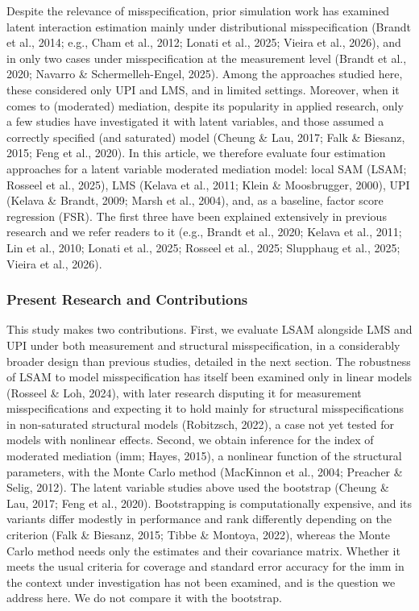 \documentclass[
  man,
  longtable,
  nolmodern,
  notxfonts,
  notimes,
  colorlinks=true,linkcolor=blue,citecolor=blue,urlcolor=blue]{apa7}
\begin{document}
Despite the relevance of misspecification, prior simulation work has
examined latent interaction estimation mainly under distributional
misspecification (Brandt et al., 2014; e.g., Cham et al., 2012; Lonati
et al., 2025; Vieira et al., 2026), and in only two cases under
misspecification at the measurement level (Brandt et al., 2020; Navarro
\& Schermelleh-Engel, 2025). Among the approaches studied here, these
considered only UPI and LMS, and in limited settings. Moreover, when it
comes to (moderated) mediation, despite its popularity in applied
research, only a few studies have investigated it with latent variables,
and those assumed a correctly specified (and saturated) model (Cheung \&
Lau, 2017; Falk \& Biesanz, 2015; Feng et al., 2020). In this article,
we therefore evaluate four estimation approaches for a latent variable
moderated mediation model: local SAM (LSAM; Rosseel et al., 2025), LMS
(Kelava et al., 2011; Klein \& Moosbrugger, 2000), UPI (Kelava \&
Brandt, 2009; Marsh et al., 2004), and, as a baseline, factor score
regression (FSR). The first three have been explained extensively in
previous research and we refer readers to it (e.g., Brandt et al., 2020;
Kelava et al., 2011; Lin et al., 2010; Lonati et al., 2025; Rosseel et
al., 2025; Slupphaug et al., 2025; Vieira et al., 2026).

\subsubsection{Present Research and
Contributions}\label{present-research-and-contributions}

This study makes two contributions. First, we evaluate LSAM alongside
LMS and UPI under both measurement and structural misspecification, in a
considerably broader design than previous studies, detailed in the next
section. The robustness of LSAM to model misspecification has itself
been examined only in linear models (Rosseel \& Loh, 2024), with later
research disputing it for measurement misspecifications and expecting it
to hold mainly for structural misspecifications in non-saturated
structural models (Robitzsch, 2022), a case not yet tested for models
with nonlinear effects. Second, we obtain inference for the index of
moderated mediation (imm; Hayes, 2015), a nonlinear function of the
structural parameters, with the Monte Carlo method (MacKinnon et al.,
2004; Preacher \& Selig, 2012). The latent variable studies above used
the bootstrap (Cheung \& Lau, 2017; Feng et al., 2020). Bootstrapping is
computationally expensive, and its variants differ modestly in
performance and rank differently depending on the criterion (Falk \&
Biesanz, 2015; Tibbe \& Montoya, 2022), whereas the Monte Carlo method
needs only the estimates and their covariance matrix. Whether it meets
the usual criteria for coverage and standard error accuracy for the imm
in the context under investigation has not been examined, and is the
question we address here. We do not compare it with the bootstrap.
\end{document}
